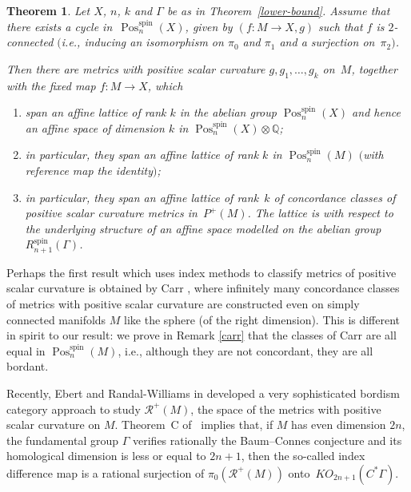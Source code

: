 \documentclass[10pt,a4paper]{amsart}
\numberwithin{equation}{section}
\newtheorem{Theorem}{Theorem}[section]
\newcommand{\rationals}{\mathbb{Q}}
\DeclareMathOperator{\Pos}{Pos}
\DeclareMathOperator{\spin}{spin}
\begin{document}
 \begin{Theorem}\label{rank>k}
 Let $X$, $n$, $k$ and $\Gamma$ be as in Theorem~{\rm \ref{lower-bound}}.
 Assume that there exists a cycle in~$\Pos^{\spin}_n(X)$, given by $(f\colon M\to X, g)$ such that $f$ is $2$-connected $($i.e., inducing an isomorphism on $\pi_0$ and $\pi_1$ and a surjection on~$\pi_2)$.

 Then there are metrics with positive scalar curvature $g, g_1,\dots,g_k$ on~$M$, together with the
 fixed map $f\colon M\to X$, which
 \begin{enumerate}\itemsep=0pt
 \item[$(1)$] span an affine lattice of rank $k$ in
 the abelian group $\Pos^{\spin}_n(X)$ and hence an affine space of dimension $k$ in
 $\Pos^{\spin}_n(X)\otimes\rationals$;
 \item[$(2)$] in particular, they span an affine lattice of rank $k$
 in $\Pos^{\spin}_n(M)$ $($with reference map the identity$)$;
 \item[$(3)$] in particular, they span an affine lattice of rank~$k$ of concordance classes of positive
 scalar curvature metrics in~$P^+(M)$. The lattice is
 with respect to the underlying
 structure of an affine space modelled on the abelian group~$R^{\spin}_{n+1}(\Gamma)$.
 \end{enumerate}
 \end{Theorem}

 Perhaps the first result which uses index methods to classify metrics of
 positive scalar curvature is obtained by Carr \cite{Carr}, where infinitely many concordance
 classes of metrics with positive scalar curvature are constructed even on
 simply
 connected manifolds $M$ like the sphere (of the right dimension). This is
 different in spirit to
 our result: we prove in Remark \ref{carr} that the classes of Carr are all equal in $
 \Pos^{\spin}_n(M)$, i.e., although they are not concordant, they are all
 bordant.

 Recently, Ebert and Randal-Williams in \cite{EbertRW} developed a
 very sophisticated bordism category approach to study $\mathcal{R}^+(M)$,
 the space of the metrics with positive
 scalar curvature on $M$. Theorem~C of~\cite{EbertRW} implies that, if $M$ has even dimension $2n$, the fundamental
 group $\Gamma$ verifies rationally the Baum--Connes conjecture and its
 homological dimension is less or equal to $2n+1$, then the so-called index
 difference map
 is a rational surjection of $\pi_0(\mathcal{R}^+(M))$ onto~$KO_{2n+1}(C^*\Gamma)$.
\end{document}
